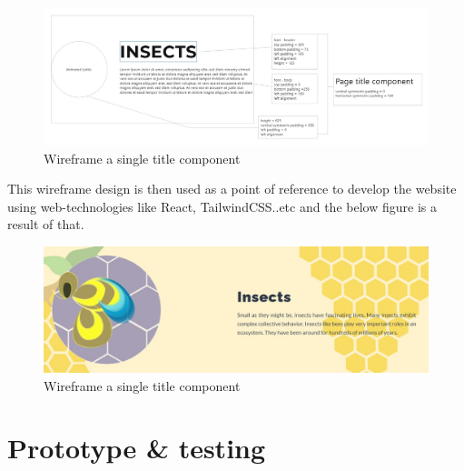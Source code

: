 \begin{figure}[h]
	\begin{center}
		\includegraphics[scale=0.3]{Figures/wireframe-1.JPG}
		\caption{Wireframe a single title component}
		\label{fig:rb}
	\end{center}
\end{figure}

This wireframe design is then used as a point of reference to develop the website using web-technologies like React, TailwindCSS..etc and the below figure is a result of that.

\begin{figure}[h]
	\begin{center}
		\includegraphics[scale=0.3]{Figures/insects-title.JPG}
		\caption{Wireframe a single title component}
		\label{fig:rb}
	\end{center}
\end{figure}


\section{Prototype \& testing}

